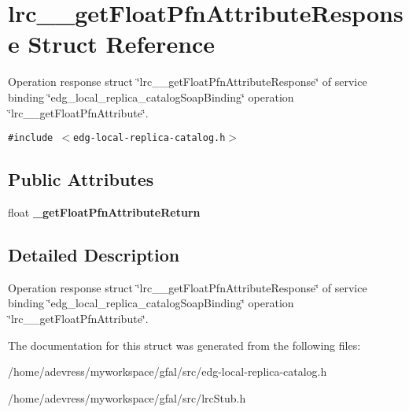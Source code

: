 \section{lrc\_\-\_\-get\-Float\-Pfn\-Attribute\-Response Struct Reference}
\label{structlrc____getFloatPfnAttributeResponse}
Operation response struct \char`\"{}lrc\_\-\_\-get\-Float\-Pfn\-Attribute\-Response\char`\"{} of service binding \char`\"{}edg\_\-local\_\-replica\_\-catalog\-Soap\-Binding\char`\"{} operation \char`\"{}lrc\_\-\_\-get\-Float\-Pfn\-Attribute\char`\"{}.  


{\tt \#include $<$edg-local-replica-catalog.h$>$}

\subsection*{Public Attributes}
\begin{CompactItemize}
\item 
float \textbf{\_\-get\-Float\-Pfn\-Attribute\-Return}\label{structlrc____getFloatPfnAttributeResponse_ea3a6fc88d1bbb38087c2a669069044d}

\end{CompactItemize}


\subsection{Detailed Description}
Operation response struct \char`\"{}lrc\_\-\_\-get\-Float\-Pfn\-Attribute\-Response\char`\"{} of service binding \char`\"{}edg\_\-local\_\-replica\_\-catalog\-Soap\-Binding\char`\"{} operation \char`\"{}lrc\_\-\_\-get\-Float\-Pfn\-Attribute\char`\"{}. 



The documentation for this struct was generated from the following files:\begin{CompactItemize}
\item 
/home/adevress/myworkspace/gfal/src/edg-local-replica-catalog.h\item 
/home/adevress/myworkspace/gfal/src/lrc\-Stub.h\end{CompactItemize}

